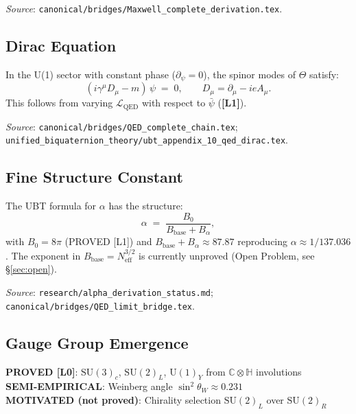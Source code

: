 \documentclass[12pt,a4paper]{article}
\newcommand{\Lone}{\textbf{[L1]}}
\begin{document}
\textit{Source}: \texttt{canonical/bridges/Maxwell\_complete\_derivation.tex}.

\subsection{Dirac Equation}

In the U(1) sector with constant phase ($\partial_\psi = 0$), the spinor
modes of $\Theta$ satisfy:
\begin{equation}
  (i\gamma^\mu D_\mu - m)\,\psi \;=\; 0, \qquad
  D_\mu = \partial_\mu - ie A_\mu.
\end{equation}
This follows from varying $\mathcal{L}_{\mathrm{QED}}$ with respect to $\bar\psi$ (\Lone).

\textit{Source}: \texttt{canonical/bridges/QED\_complete\_chain.tex};
\texttt{unified\_biquaternion\_theory/ubt\_appendix\_10\_qed\_dirac.tex}.

\subsection{Fine Structure Constant}

The UBT formula for $\alpha$ has the structure:
\begin{equation}
  \alpha \;=\; \frac{B_0}{B_{\mathrm{base}} + B_\alpha},
\end{equation}
with $B_0 = 8\pi$ (PROVED [L1]) and $B_{\mathrm{base}} + B_\alpha \approx 87.87$
reproducing $\alpha \approx 1/137.036$.  The exponent in
$B_{\mathrm{base}} = N_{\mathrm{eff}}^{3/2}$ is currently unproved (Open Problem,
see \S\ref{sec:open}).

\textit{Source}: \texttt{research/alpha\_derivation\_status.md};
\texttt{canonical/bridges/QED\_limit\_bridge.tex}.

\subsection{Gauge Group Emergence}

\begin{tcolorbox}[colback=green!5!white,colframe=green!50!black,title=Gauge Group Status]
\textbf{PROVED [L0]}: $\mathrm{SU}(3)_c$, $\mathrm{SU}(2)_L$, $\mathrm{U}(1)_Y$
from $\mathbb{C}\otimes\mathbb{H}$ involutions\\
\textbf{SEMI-EMPIRICAL}: Weinberg angle $\sin^2\theta_W \approx 0.231$\\
\textbf{MOTIVATED (not proved)}: Chirality selection $\mathrm{SU}(2)_L$ over $\mathrm{SU}(2)_R$
\end{tcolorbox}
\end{document}
